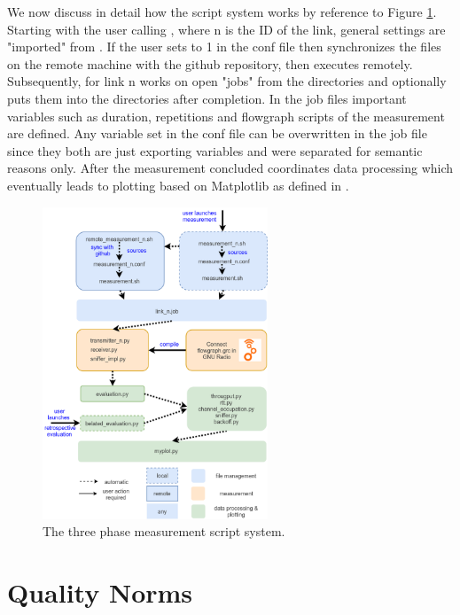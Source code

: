 We now discuss in detail how the script system works by reference to Figure \ref{fig:script-system}.
Starting with the user calling , where n is the ID of the link, general settings are "imported" from . If the user sets  to 1 in the conf file then  synchronizes the files on the remote machine with the github repository, then executes  remotely. Subsequently,  for link n works on open "jobs" from the  directories and optionally puts them into the  directories after completion. In the job files important variables such as duration, repetitions and flowgraph scripts of the measurement are defined. Any variable set in the conf file can be overwritten in the job file since they both are just exporting variables and were separated for semantic reasons only. After the measurement concluded  coordinates data processing which eventually leads to plotting based on Matplotlib as defined in .

\begin{figure}[bt]
	\label{fig:script-system}
	\begin{center}
		\includegraphics[width=0.6\textwidth]{pictures/script_system}
	\end{center}
	\caption{The three phase measurement script system.}
\end{figure}

\section{Quality Norms}
\label{sec:quality-standards}

